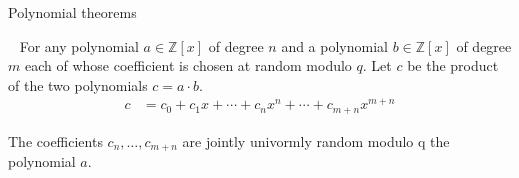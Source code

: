 \begin{section}{Polynomial theorems}

  \begin{lemma}~\cite{DBLP:conf/asiacrypt/Lyubashevsky16}
    For any polynomial $a \in \mathbb{Z}[x]$ of degree $n$ and a polynomial $b \in \mathbb{Z}[x]$ of degree $m$ each of whose coefficient is chosen at random modulo $q$.
    Let $c$ be the product of the two polynomials $c = a \cdot b$.
    \begin{align*}
    c &= c_0 + c_1 x + \cdots + c_n x^n + \cdots + c_{m+n}x^{m+n}
    \end{align*}

    The coefficients $c_n, \dots, c_{m+n}$ are jointly univormly random modulo q \wrt the polynomial $a$.
  \end{lemma}

\end{section}